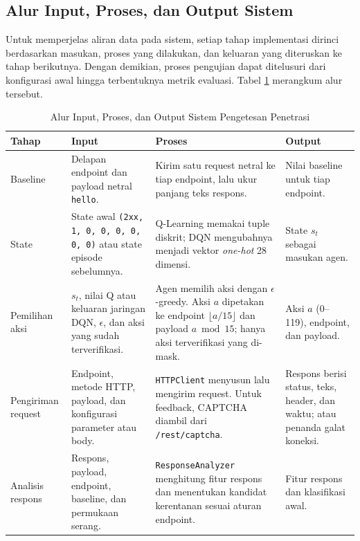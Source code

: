 \subsection{Alur Input, Proses, dan Output Sistem}

Untuk memperjelas aliran data pada sistem, setiap tahap implementasi dirinci berdasarkan masukan, proses yang dilakukan, dan keluaran yang diteruskan ke tahap berikutnya. Dengan demikian, proses pengujian dapat ditelusuri dari konfigurasi awal hingga terbentuknya metrik evaluasi. Tabel \ref{tab:alur_input_output} merangkum alur tersebut.

\begin{table}[htbp]
\centering
\caption{Alur Input, Proses, dan Output Sistem Pengetesan Penetrasi}
\label{tab:alur_input_output}
\footnotesize
\setlength{\tabcolsep}{2pt}
\renewcommand{\arraystretch}{1.12}
\begin{tabularx}{\textwidth}{@{}
>{\raggedright\arraybackslash}p{1.7cm}
>{\raggedright\arraybackslash}p{2.8cm}
>{\raggedright\arraybackslash}X
>{\raggedright\arraybackslash}p{2.6cm}
@{}}
\toprule
\textbf{Tahap} & \textbf{Input} & \textbf{Proses} & \textbf{Output} \\
\midrule
Baseline & Delapan endpoint dan payload netral \texttt{hello}. & Kirim satu request netral ke tiap endpoint, lalu ukur panjang teks respons. & Nilai baseline untuk tiap endpoint. \\
\addlinespace[2pt]
State & State awal \texttt{(2xx, 1, 0, 0, 0, 0, 0, 0)} atau state episode sebelumnya. & Q-Learning memakai tuple diskrit; DQN mengubahnya menjadi vektor \textit{one-hot} 28 dimensi. & State $s_t$ sebagai masukan agen. \\
\addlinespace[2pt]
Pemilihan aksi & $s_t$, nilai Q atau keluaran jaringan DQN, $\epsilon$, dan aksi yang sudah terverifikasi. & Agen memilih aksi dengan $\epsilon$-greedy. Aksi $a$ dipetakan ke endpoint $\lfloor a/15\rfloor$ dan payload $a\bmod15$; hanya aksi terverifikasi yang di-mask. & Aksi $a$ (0--119), endpoint, dan payload. \\
\addlinespace[2pt]
Pengiriman request & Endpoint, metode HTTP, payload, dan konfigurasi parameter atau body. & \texttt{HTTPClient} menyusun lalu mengirim request. Untuk feedback, CAPTCHA diambil dari \texttt{/rest/captcha}. & Respons berisi status, teks, header, dan waktu; atau penanda galat koneksi. \\
\addlinespace[2pt]
Analisis respons & Respons, payload, endpoint, baseline, dan permukaan serang. & \texttt{ResponseAnalyzer} menghitung fitur respons dan menentukan kandidat kerentanan sesuai aturan endpoint. & Fitur respons dan klasifikasi awal. \\

\end{tabularx}
\end{table}
